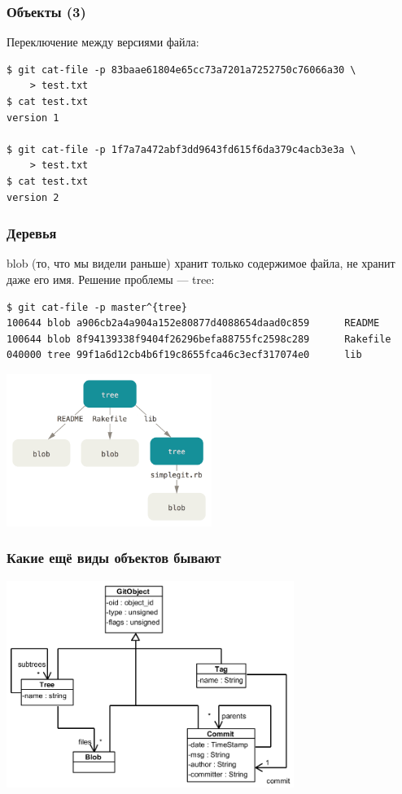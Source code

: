 \documentclass[xetex,mathserif,serif]{beamer}
\begin{document}
	\begin{frame}[fragile]
		\frametitle{Объекты (3)}
		Переключение между версиями файла:
		\begin{verbatim}
$ git cat-file -p 83baae61804e65cc73a7201a7252750c76066a30 \
    > test.txt
$ cat test.txt
version 1

$ git cat-file -p 1f7a7a472abf3dd9643fd615f6da379c4acb3e3a \
    > test.txt
$ cat test.txt
version 2
		\end{verbatim}
	\end{frame}

	\begin{frame}[fragile]
		\frametitle{Деревья}
		blob (то, что мы видели раньше) хранит только содержимое файла, не хранит даже его имя. Решение проблемы --- tree:
		\begin{scriptsize}
		\begin{verbatim}
$ git cat-file -p master^{tree}
100644 blob a906cb2a4a904a152e80877d4088654daad0c859      README
100644 blob 8f94139338f9404f26296befa88755fc2598c289      Rakefile
040000 tree 99f1a6d12cb4b6f19c8655fca46c3ecf317074e0      lib
		\end{verbatim}
		\end{scriptsize}
		\begin{center}
			\includegraphics[width=0.5\textwidth]{gitTreeObject.png}
		\end{center}
	\end{frame}

	\begin{frame}
		\frametitle{Какие ещё виды объектов бывают}
		\begin{center}
			\includegraphics[width=0.7\textwidth]{gitDataStructure.png}
		\end{center}
	\end{frame}
\end{document}
